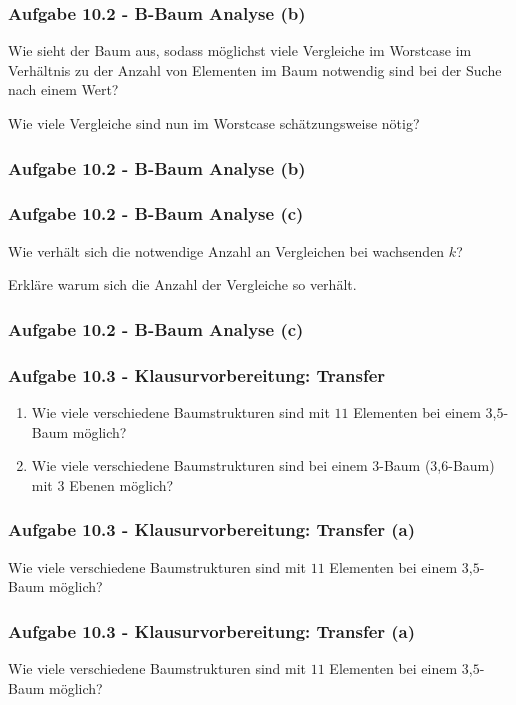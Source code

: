 \documentclass{beamer}
\begin{document}
\begin{frame}[t]
  \frametitle{Aufgabe 10.2 - B-Baum Analyse (b)}
  Wie sieht der Baum aus, sodass möglichst viele Vergleiche im Worstcase im Verhältnis
  zu der Anzahl von Elementen im Baum notwendig sind bei der Suche nach einem
  Wert?

  \smallskip
  Wie viele Vergleiche sind nun im Worstcase schätzungsweise nötig?
\end{frame}

\begin{frame}
  \frametitle{Aufgabe 10.2 - B-Baum Analyse (b)}
\end{frame}

\begin{frame}[t]
  \frametitle{Aufgabe 10.2 - B-Baum Analyse (c)}

  Wie verhält sich die notwendige Anzahl an Vergleichen bei wachsenden $k$?

  \smallskip
  Erkläre warum sich die Anzahl der Vergleiche so verhält.
\end{frame}

\begin{frame}
  \frametitle{Aufgabe 10.2 - B-Baum Analyse (c)}
\end{frame}

\begin{frame}
  \frametitle{Aufgabe 10.3 - Klausurvorbereitung: Transfer}

  \begin{enumerate}
    \renewcommand{\theenumi}{\alph{enumi}}
    \item Wie viele verschiedene Baumstrukturen sind mit $11$ Elementen bei einem $3$,$5$-Baum
          möglich?
    \item Wie viele verschiedene Baumstrukturen sind bei einem $3$-Baum ($3$,$6$-Baum) mit $3$
          Ebenen möglich?
  \end{enumerate}
\end{frame}

\begin{frame}[t]
  \frametitle{Aufgabe 10.3 - Klausurvorbereitung: Transfer (a)}

  Wie viele verschiedene Baumstrukturen sind mit $11$ Elementen bei einem $3$,$5$-Baum möglich?
\end{frame}

\begin{frame}[t]
  \frametitle{Aufgabe 10.3 - Klausurvorbereitung: Transfer (a)}

  Wie viele verschiedene Baumstrukturen sind mit $11$ Elementen bei einem $3$,$5$-Baum möglich?
\end{frame}
\end{document}
